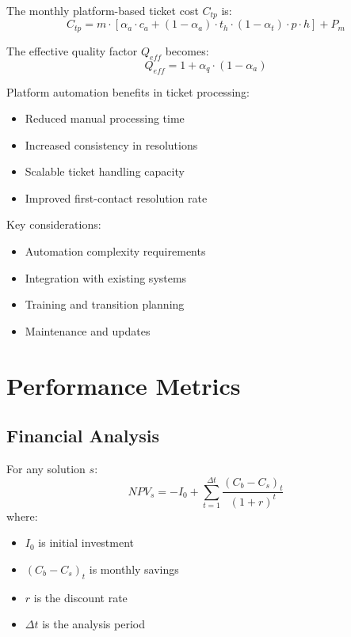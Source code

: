 \documentclass[12pt,a4paper]{article}
\newenvironment{definition}[1]
{\begin{mdframed}[style=definitionstyle,frametitle={Definition: #1}]}
{\end{mdframed}}
\newenvironment{observation}
{\begin{mdframed}[style=observationstyle,frametitle={Observation}]}
{\end{mdframed}}
\begin{document}
\begin{definition}{Platform Ticket Cost}
The monthly platform-based ticket cost $C_{tp}$ is:
\begin{equation}
    C_{tp} = m \cdot [\alpha_a \cdot c_a + (1-\alpha_a) \cdot t_h \cdot (1-\alpha_t) \cdot p \cdot h] + P_m
\end{equation}

The effective quality factor $Q_{eff}$ becomes:
\begin{equation}
    Q_{eff} = 1 + \alpha_q \cdot (1 - \alpha_a)
\end{equation}
\end{definition}

\begin{observation}
Platform automation benefits in ticket processing:
\begin{itemize}
    \item Reduced manual processing time
    \item Increased consistency in resolutions
    \item Scalable ticket handling capacity
    \item Improved first-contact resolution rate
\end{itemize}

Key considerations:
\begin{itemize}
    \item Automation complexity requirements
    \item Integration with existing systems
    \item Training and transition planning
    \item Maintenance and updates
\end{itemize}
\end{observation}

\section{Performance Metrics}
\subsection{Financial Analysis}
\begin{definition}{NPV Calculation}
For any solution $s$:
\begin{equation}
    NPV_s = -I_0 + \sum_{t=1}^{\Delta t} \frac{(C_b - C_s)_t}{(1 + r)^t}
\end{equation}
where:
\begin{itemize}
    \item $I_0$ is initial investment
    \item $(C_b - C_s)_t$ is monthly savings
    \item $r$ is the discount rate
    \item $\Delta t$ is the analysis period
\end{itemize}
\end{definition}
\end{document}
